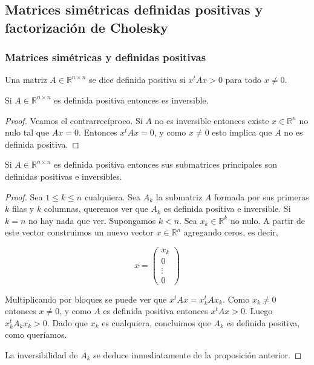 \subsection{Matrices simétricas definidas positivas y factorización de Cholesky}

\subsubsection{Matrices simétricas y definidas positivas}

\begin{defi}
Una matriz $A \in \mathbb{R}^{n \times n}$ se dice definida positiva si $x^tAx > 0$ para todo $x \neq 0$.
\end{defi}

\begin{propo}
Si $A \in \mathbb{R}^{n \times n}$ es definida positiva entonces es inversible.

\begin{proof}
Veamos el contrarrecíproco. Si $A$ no es inversible entonces existe $x \in \mathbb{R}^n$ no nulo tal que $Ax = 0$. Entonces $x^t A x = 0$, y como $x \neq 0$ esto implica que $A$ no es definida positiva.
\end{proof}
\end{propo}

\begin{propo}
\label{propo:defpos}
Si $A \in \mathbb{R}^{n \times n}$ es definida positiva entonces sus submatrices principales son definidas positivas e inversibles.

\begin{proof}
Sea $1 \leq k \leq n$ cualquiera. Sea $A_k$ la submatriz $A$ formada por sus primeras $k$ filas y $k$ columnas, queremos ver que $A_k$ es definida positiva e inversible. Si $k = n$ no hay nada que ver. Supongamos $k < n$. Sea $x_k \in \mathbb{R}^k$ no nulo. A partir de este vector construimos un nuevo vector $x \in \mathbb{R}^n$ agregando ceros, es decir,

\[x = \begin{pmatrix}
x_k\\
0 \\
\vdots \\
0
\end{pmatrix}\]

Multiplicando por bloques se puede ver que $x^t A x = x_k^t A x_k$. Como $x_k \neq 0$ entonces $x \neq 0$, y como $A$ es definida positiva entonces $x^t A x > 0$. Luego $x_k^t A_k x_k > 0$. Dado que $x_k$ es cualquiera, concluimos que $A_k$ es definida positiva, como queríamos.

La inversibilidad de $A_k$ se deduce inmediatamente de la proposición anterior.

\end{proof}
\end{propo}

